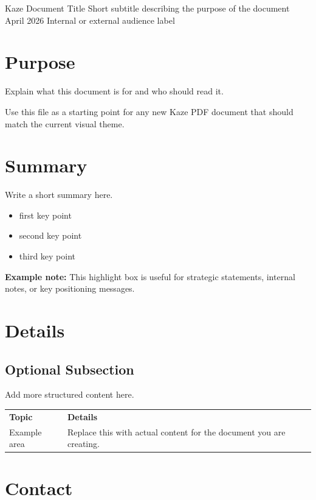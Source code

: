 \documentclass[11pt,a4paper]{article}
\begin{document}
\KazeCover
  {Kaze Document Title}
  {Short subtitle describing the purpose of the document}
  {April 2026}
  {Internal or external audience label}

\KazeDocumentNotice

\section{Purpose}

Explain what this document is for and who should read it.

\begin{kazecalloutbox}
Use this file as a starting point for any new Kaze PDF document that should match the current visual theme.
\end{kazecalloutbox}

\section{Summary}

Write a short summary here.

\begin{itemize}
    \item first key point
    \item second key point
    \item third key point
\end{itemize}

\begin{kazehighlightbox}
\textbf{Example note:} This highlight box is useful for strategic statements, internal notes, or key positioning messages.
\end{kazehighlightbox}

\section{Details}

\subsection{Optional Subsection}

Add more structured content here.

\begin{longtable}{p{} p{}}
\textbf{Topic} & \textbf{Details} \\
Example area & Replace this with actual content for the document you are creating. \\
\end{longtable}

\section{Contact}

\KazeContactBlock
\end{document}

